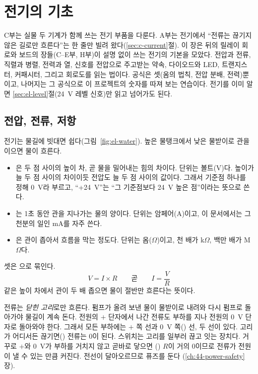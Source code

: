 \chapter{전기의 기초}\label{ch:39-electric-basics}

C부는 실물 두 기계가 함께 쓰는 전기 부품을 다룬다. A부는 전기에서 ``전류는 끊기지 않은 길로만 흐른다''는 한 줄만
빌려 왔다(\ref{sec:c-current}절). 이 장은 뒤의 릴레이 회로와 보드의 장들(C--E부, H부)이 설명 없이 쓰는 전기의 기본을 모았다.
전압과 전류, 직렬과 병렬, 전력과 열, 신호를 전압으로 주고받는 약속, 다이오드와 LED, 트랜지스터, 커패시터, 그리고
회로도를 읽는 법이다. 공식은 셋(옴의 법칙, 전압 분배, 전력)뿐이고, 나머지는 그 공식으로 이 프로젝트의 숫자를
따져 보는 연습이다. 전기를 이미 알면 \ref{sec:el-level}절(24~V 레벨 신호)만 읽고 넘어가도 된다.

\section{전압, 전류, 저항}\label{sec:el-vir}

\Why 전기는 물길에 빗대면 쉽다(그림~\ref{fig:el-water}). 높은 물탱크에서 낮은 물받이로 관을 이으면 물이 흐른다.
\begin{itemize}
\item {}은 두 점 사이의 높이 차, 곧 물을 밀어내는 힘의 차이다. 단위는 볼트(V)다. 높이가 늘 두 점
사이의 차이이듯 전압도 늘 두 점 사이의 값이다. 그래서 기준점 하나를 정해 0~V라 부르고, ``+24~V''는 ``그
기준점보다 24~V 높은 점''이라는 뜻으로 쓴다.
\item {}는 1초 동안 관을 지나가는 물의 양이다. 단위는 암페어(A)이고, 이 문서에서는 그 천분의
일인 mA를 자주 쓴다.
\item {}은 관이 좁아서 흐름을 막는 정도다. 단위는 옴($\Omega$)이고, 천 배가 k$\Omega$,
백만 배가 M$\Omega$다.
\end{itemize}
셋은 으로 묶인다.
\[
  V = I \times R \qquad\text{곧}\qquad I = \frac{V}{R}
\]
같은 높이 차에서 관이 두 배 좁으면 물이 절반만 흐른다는 뜻이다.

전류는 \emph{닫힌 고리}로만 흐른다. 펌프가 올려 보낸 물이 물받이로 내려와 다시 펌프로 돌아가야 물길이 계속
돈다. 전원의 $+$ 단자에서 나간 전류도 부하를 지나 전원의 0~V 단자로 돌아와야 한다. 그래서 모든 부하에는
$+$ 쪽 선과 0~V 쪽() 선, 두 선이 있다. 고리가 어디서든 끊기면() 전류는 0이
된다. 스위치는 고리를 일부러 끊고 잇는 장치다. 거꾸로 $+$와 0~V가 부하를 거치지 않고 곧바로 닿으면
() $R$이 거의 0이므로 전류가 전원이 낼 수 있는 만큼 커진다. 전선이 달아오르므로 퓨즈를 둔다
(\ref{ch:44-power-safety}장).

